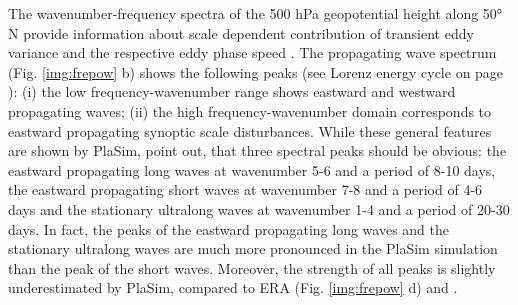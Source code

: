 \documentclass[12pt,a4paper,twoside,openright,headinclude,liststotoc,bibtotoc]{scrreprt}
\begin{document}
The wavenumber-frequency spectra of the 500 hPa geopotential height along 50° N provide information about scale dependent contribution of transient eddy variance and the respective eddy phase speed \citep{Fraedrich1978,Dell'Aquila2005}. The propagating wave spectrum (Fig. \ref{img:frepow} b) shows the following peaks (see Lorenz energy cycle on page \pageref{img:lez}): (i) the low frequency-wavenumber range shows eastward and westward propagating waves; (ii) the high frequency-wavenumber domain corresponds to eastward propagating synoptic scale disturbances. While these general features are shown by PlaSim, \citet{Fraedrich1978} point out, that three spectral peaks should be obvious: the eastward propagating long waves at wavenumber 5-6 and a period of 8-10 days, the eastward propagating short waves at wavenumber 7-8 and a period of 4-6 days and the stationary ultralong waves at wavenumber 1-4 and a period of 20-30 days. In fact, the peaks of the eastward propagating long waves and the stationary ultralong waves are much more pronounced in the PlaSim simulation than the peak of the short waves. Moreover, the strength of all peaks is slightly underestimated by PlaSim, compared to ERA (Fig. \ref{img:frepow} d) and \citet{Fraedrich1978}.
\end{document}
